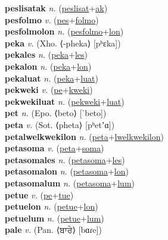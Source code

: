 \textbf{peslisatak} \textit{n.} (\hyperref[peslisat]{peslisat}+\hyperref[ak]{ak})
 \label{peslisatak} \\
\textbf{pesfolmo} \textit{v.} (\hyperref[pes]{pes}+\hyperref[folmo]{folmo})
 \label{pesfolmo} \\
\textbf{pesfolmolon} \textit{n.} (\hyperref[pesfolmo]{pesfolmo}+\hyperref[lon]{lon})
 \label{pesfolmolon} \\
\textbf{peka} \textit{v.} (Xho. ⟨-pheka⟩ [pʰɛka])
 \label{peka} \\
\textbf{pekales} \textit{n.} (\hyperref[peka]{peka}+\hyperref[les]{les})
 \label{pekales} \\
\textbf{pekalon} \textit{n.} (\hyperref[peka]{peka}+\hyperref[lon]{lon})
 \label{pekalon} \\
\textbf{pekaluat} \textit{n.} (\hyperref[peka]{peka}+\hyperref[luat]{luat})
 \label{pekaluat} \\
\textbf{pekweki} \textit{v.} (\hyperref[pe]{pe}+\hyperref[kweki]{kweki})
 \label{pekweki} \\
\textbf{pekwekiluat} \textit{n.} (\hyperref[pekweki]{pekweki}+\hyperref[luat]{luat})
 \label{pekwekiluat} \\
\textbf{pet} \textit{n.} (Epo. ⟨beto⟩ [ˈbeto])
 \label{pet} \\
\textbf{peta} \textit{v.} (Sot. ⟨pheta⟩ [pʰetʼɑ])
 \label{peta} \\
\textbf{petalwelkwekilon} \textit{n.} (\hyperref[peta]{peta}+\hyperref[lwelkwekilon]{lwelkwekilon})
 \label{petalwelkwekilon} \\
\textbf{petasoma} \textit{v.} (\hyperref[peta]{peta}+\hyperref[soma]{soma})
 \label{petasoma} \\
\textbf{petasomales} \textit{n.} (\hyperref[petasoma]{petasoma}+\hyperref[les]{les})
 \label{petasomales} \\
\textbf{petasomalon} \textit{n.} (\hyperref[petasoma]{petasoma}+\hyperref[lon]{lon})
 \label{petasomalon} \\
\textbf{petasomalum} \textit{n.} (\hyperref[petasoma]{petasoma}+\hyperref[lum]{lum})
 \label{petasomalum} \\
\textbf{petue} \textit{v.} (\hyperref[pe]{pe}+\hyperref[tue]{tue})
 \label{petue} \\
\textbf{petuelon} \textit{n.} (\hyperref[petue]{petue}+\hyperref[lon]{lon})
 \label{petuelon} \\
\textbf{petuelum} \textit{n.} (\hyperref[petue]{petue}+\hyperref[lum]{lum})
 \label{petuelum} \\
\textbf{pale} \textit{v.} (Pan. ⟨ਬਾਰੇ⟩ [bɑɾe])
